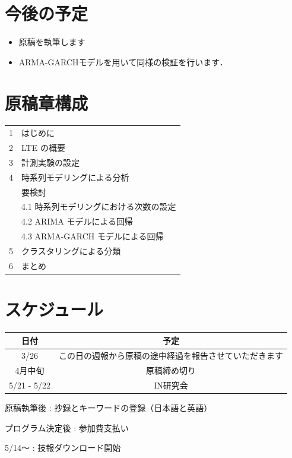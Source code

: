 \documentclass[a4j]{jarticle}
\begin{document}
\section{今後の予定}
\begin{itemize}
\item 原稿を執筆します
\item ARMA-GARCHモデルを用いて同様の検証を行います．
\end{itemize}
\section{原稿章構成}
\begin{table}[H]
\begin{tabular}{ll}
1&はじめに\\
2& LTE の概要\\
3&計測実験の設定\\
4&時系列モデリングによる分析\\
&要検討\\
&4.1 時系列モデリングにおける次数の設定\\
&4.2 ARIMA モデルによる回帰\\
&4.3 ARMA-GARCH モデルによる回帰\\
5&クラスタリングによる分類\\
6&まとめ
\end{tabular}
\end{table}
\section{スケジュール}
\begin{table}[H]
\begin{tabular}{|c|c|}
\hline
日付&予定\\
\hline
3/26&この日の週報から原稿の途中経過を報告させていただきます\\
\hline
4月中旬&原稿締め切り\\
\hline
5/21 - 5/22&IN研究会\\
\hline
\end{tabular}
\end{table}
原稿執筆後 : 抄録とキーワードの登録（日本語と英語）

プログラム決定後 : 参加費支払い

5/14～ : 技報ダウンロード開始



\end{document}

